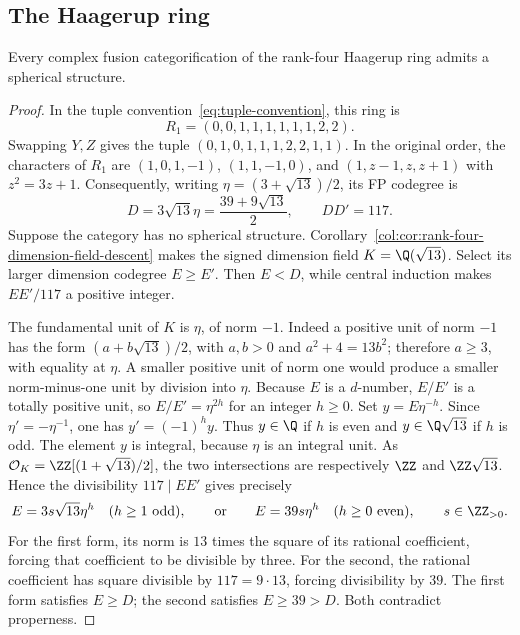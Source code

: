 \subsection{The Haagerup ring}
\begin{theorem}\label{haag:thm:automatic-spherical}
Every complex fusion categorification of the rank-four Haagerup ring
admits a spherical structure.
\end{theorem}
\begin{proof}
In the tuple convention~\eqref{eq:tuple-convention}, this ring is
\[
 R_1=(0,0,1,1,1,1,1,1,2,2).
\]
Swapping $Y,Z$ gives the tuple $(0,1,0,1,1,1,2,2,1,1)$.
In the original order, the characters of $R_1$ are $(1,0,1,-1)$, $(1,1,-1,0)$, and
$(1,z-1,z,z+1)$ with $z^2=3z+1$. Consequently, writing
$\eta=(3+\sqrt{13})/2$, its FP codegree is
\[
 D=3\sqrt{13}\eta=\frac{39+9\sqrt{13}}2,
 \qquad DD'=117.
\]
Suppose the category has no spherical structure.
Corollary~\ref{col:cor:rank-four-dimension-field-descent} makes the
signed dimension field $K=\Q(\sqrt{13})$.
Select its larger dimension codegree $E\ge E'$.
Then $E<D$, while central induction makes $EE'/117$ a positive integer.

The fundamental unit of $K$ is $\eta$, of norm $-1$.
Indeed a positive unit of norm $-1$ has the form
$(a+b\sqrt{13})/2$, with $a,b>0$ and $a^2+4=13b^2$;
therefore $a\ge3$, with equality at $\eta$.
A smaller positive unit of norm one would produce a smaller
norm-minus-one unit by division into $\eta$.
Because $E$ is a $d$-number, $E/E'$ is a totally positive unit,
so $E/E'=\eta^{2h}$ for an integer $h\ge0$. Set $y=E\eta^{-h}$.
Since $\eta'=-\eta^{-1}$, one has $y'=(-1)^h y$.
Thus $y\in\Q$ if $h$ is even and
$y\in\Q\sqrt{13}$ if $h$ is odd.
The element $y$ is integral, because $\eta$ is an integral unit.
As $\mathcal O_K=\ZZ[(1+\sqrt{13})/2]$, the two intersections
are respectively $\ZZ$ and $\ZZ\sqrt{13}$.
Hence the divisibility $117\mid EE'$ gives precisely
\[
 E=3s\sqrt{13}\eta^h\quad(h\ge1\text{ odd}),
 \qquad\text{or}\qquad
 E=39s\eta^h\quad(h\ge0\text{ even}),
 \qquad s\in\ZZ_{>0}.
\]
For the first form, its norm is $13$ times the square of its rational
coefficient, forcing that coefficient to be divisible by three.
For the second, the rational coefficient has square divisible by
$117=9\cdot13$, forcing divisibility by $39$.
The first form satisfies $E\ge D$; the second satisfies
$E\ge39>D$. Both contradict properness.
\end{proof}

